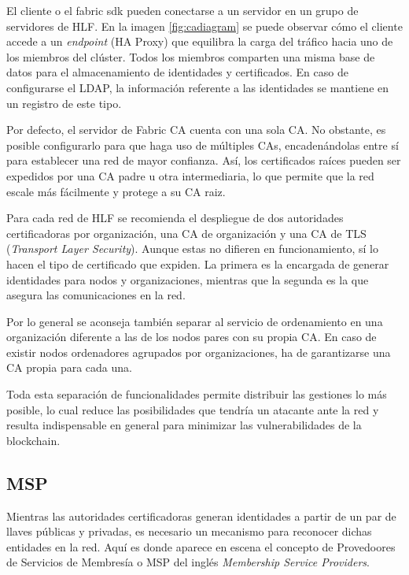 El cliente o el fabric sdk pueden conectarse a un servidor en un grupo de servidores de HLF. En la imagen \ref{fig:cadiagram} se puede observar c\'omo el cliente accede a un \emph{endpoint} (HA Proxy) que equilibra la carga del tr\'afico hacia uno de los miembros del cl\'uster. Todos los miembros comparten una misma base de datos para el almacenamiento de identidades y certificados. En caso de configurarse el LDAP, la informaci\'on referente a las identidades se mantiene en un registro de este tipo.

Por defecto, el servidor de Fabric CA cuenta con una sola CA. No obstante, es posible configurarlo para que haga uso de m\'ultiples CAs, encaden\'andolas entre s\'i para establecer una red de mayor confianza. As\'i, los certificados ra\'ices pueden ser expedidos por una CA padre u otra intermediaria, lo que permite que la red escale m\'as f\'acilmente y protege a su CA raiz.%

Para cada red de HLF se recomienda el despliegue de dos autoridades certificadoras por organizaci\'on, una CA de organizaci\'on y una CA de TLS (\emph{Transport Layer Security}). Aunque estas no difieren en funcionamiento, s\'i lo hacen el tipo de certificado que expiden. La primera es la encargada de generar identidades para nodos y organizaciones, mientras que la segunda es la que asegura las comunicaciones en la red.

Por lo general se aconseja tambi\'en separar al servicio de ordenamiento en una organizaci\'on diferente a las de los nodos pares con su propia CA. En caso de existir nodos ordenadores agrupados por organizaciones, ha de garantizarse una CA propia para cada una.

Toda esta separaci\'on de funcionalidades permite distribuir las gestiones lo m\'as posible, lo cual reduce las posibilidades que tendr\'ia un atacante ante la red y resulta indispensable en general para minimizar las vulnerabilidades de la blockchain.


\subsection{MSP}
Mientras las autoridades certificadoras generan identidades a partir de un par de llaves p\'ublicas y privadas, es necesario un mecanismo para reconocer dichas entidades en la red. Aqu\'i es donde aparece en escena el concepto de Provedoores de Servicios de Membres\'ia o MSP del ingl\'es \emph{Membership Service Providers}.

